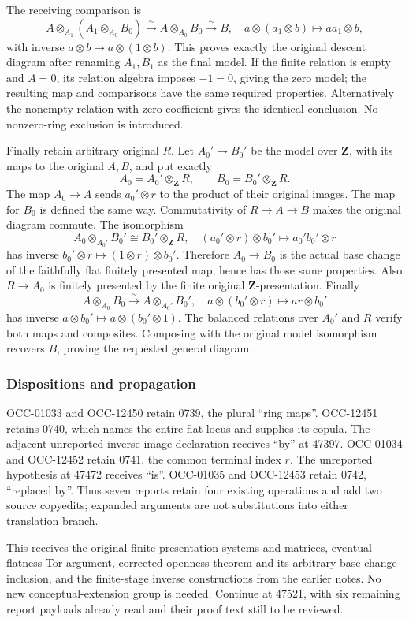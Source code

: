 The receiving comparison is \[
 A\otimes_{A_1}(A_1\otimes_{A_0}B_0)
   \xrightarrow{\sim} A\otimes_{A_0}B_0\xrightarrow{\sim}B,
 \quad a\otimes(a_1\otimes b)\longmapsto aa_1\otimes b,
\] with inverse \(a\otimes b\mapsto a\otimes(1\otimes b)\). This proves exactly the original descent diagram after renaming \(A_1,B_1\) as the final model. If the finite relation is empty and \(A=0\), its relation algebra imposes \(-1=0\), giving the zero model; the resulting map and comparisons have the same required properties. Alternatively the nonempty relation with zero coefficient gives the identical conclusion. No nonzero-ring exclusion is introduced.

Finally retain arbitrary original \(R\). Let \(A_0'\to B_0'\) be the model over \(\mathbf Z\), with its maps to the original \(A,B\), and put exactly \[
 A_0=A_0'\otimes_{\mathbf Z}R,\qquad
 B_0=B_0'\otimes_{\mathbf Z}R.
\] The map \(A_0\to A\) sends \(a_0'\otimes r\) to the product of their original images. The map for \(B_0\) is defined the same way. Commutativity of \(R\to A\to B\) makes the original diagram commute. The isomorphism \[
 A_0\otimes_{A_0'}B_0'\cong B_0'\otimes_{\mathbf Z}R,
 \quad(a_0'\otimes r)\otimes b_0'\longmapsto a_0'b_0'\otimes r
\] has inverse \(b_0'\otimes r\mapsto(1\otimes r)\otimes b_0'\). Therefore \(A_0\to B_0\) is the actual base change of the faithfully flat finitely presented map, hence has those same properties. Also \(R\to A_0\) is finitely presented by the finite original \(\mathbf Z\)-presentation. Finally \[
 A\otimes_{A_0}B_0\xrightarrow{\sim}A\otimes_{A_0'}B_0',
 \quad a\otimes(b_0'\otimes r)\longmapsto ar\otimes b_0'
\] has inverse \(a\otimes b_0'\mapsto a\otimes(b_0'\otimes1)\). The balanced relations over \(A_0'\) and \(R\) verify both maps and composites. Composing with the original model isomorphism recovers \(B\), proving the requested general diagram.

\subsubsection{Dispositions and propagation}\label{algebra-proof-072-dispositions-and-propagation}

OCC-01033 and OCC-12450 retain 0739, the plural ``ring maps''. OCC-12451 retains 0740, which names the entire flat locus and supplies its copula. The adjacent unreported inverse-image declaration receives ``by'' at 47397. OCC-01034 and OCC-12452 retain 0741, the common terminal index \(r\). The unreported hypothesis at 47472 receives ``is''. OCC-01035 and OCC-12453 retain 0742, ``replaced by''. Thus seven reports retain four existing operations and add two source copyedits; expanded arguments are not substitutions into either translation branch.

This receives the original finite-presentation systems and matrices, eventual-flatness Tor argument, corrected openness theorem and its arbitrary-base-change inclusion, and the finite-stage inverse constructions from the earlier notes. No new conceptual-extension group is needed. Continue at 47521, with six remaining report payloads already read and their proof text still to be reviewed.
